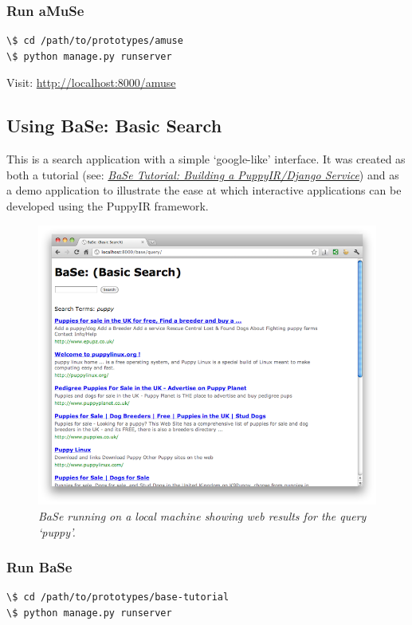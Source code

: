 \documentclass[letterpaper,10pt,english]{sphinxmanual}
\begin{document}
\subsubsection{Run aMuSe}
\label{prototypes:run-amuse}
\begin{Verbatim}[commandchars=\\\{\}]
\$ cd /path/to/prototypes/amuse
\$ python manage.py runserver
\end{Verbatim}

Visit: \href{http://localhost:8000/amuse}{http://localhost:8000/amuse}


\subsection{Using BaSe: Basic Search}
\label{prototypes:using-base-basic-search}
This is a search application with a simple `google-like' interface. It was created as both a tutorial (see: {\hyperref[django-service:building-a-puppyir-django-service]{\emph{BaSe Tutorial: Building a PuppyIR/Django Service}}}) and as a demo application to illustrate the ease at which interactive applications can be developed using the PuppyIR framework.
\begin{figure}[htbp]
\centering
\capstart

\includegraphics{puppy-base.png}
\caption{\emph{BaSe running on a local machine showing web results for the query `puppy'.}}\end{figure}


\subsubsection{Run BaSe}
\label{prototypes:run-base}
\begin{Verbatim}[commandchars=\\\{\}]
\$ cd /path/to/prototypes/base-tutorial
\$ python manage.py runserver
\end{Verbatim}
\end{document}
